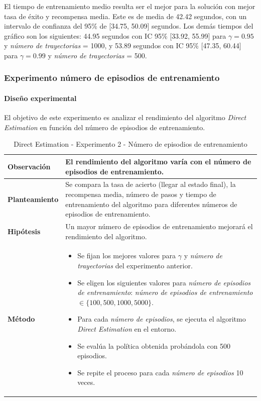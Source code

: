 El tiempo de entrenamiento medio resulta ser el mejor para la solución con mejor tasa de éxito y recompensa media. Este es de media de 42.42 segundos, con un intervalo de confianza del 95\% de [34.75,  50.09] segundos. Los demás tiempos del gráfico son los siguientes: 44.95 segundos con IC 95\% [33.92,  55.99] para $\gamma = 0.95$ y \textit{número de trayectorias} = 1000, y 53.89 segundos con IC 95\% [47.35,  60.44] para $\gamma = 0.99$ y \textit{número de trayectorias} = 500.

\subsubsection{Experimento número de episodios de entrenamiento}

\paragraph{Diseño experimental}

El objetivo de este experimento es analizar el rendimiento del algoritmo \textit{Direct Estimation} en función del número de episodios de entrenamiento.

\begin{table}[H]
    \centering
    \begin{tabularx}{\textwidth}{|p{4cm}|X|} %
        \hline %
        \textbf{Observación} & El rendimiento del algoritmo varía con el número de episodios de entrenamiento.
        \\ \hline
        \textbf{Planteamiento} & Se compara la tasa de acierto (llegar al estado final), la recompensa media, número de pasos y tiempo de entrenamiento del algoritmo para diferentes números de episodios de entrenamiento.
        \\ \hline
        \textbf{Hipótesis} & Un mayor número de episodios de entrenamiento mejorará el rendimiento del algoritmo.
        \\ \hline
        \textbf{Método} & 
        \begin{itemize}
            \item Se fijan los mejores valores para \(\gamma\) y \textit{número de trayectorias} del experimento anterior.
            \item Se eligen los siguientes valores para \textit{número de episodios de entrenamiento}: \textit{número de episodios de entrenamiento} \(\in \{100, 500, 1000, 5000\}\).
            \item Para cada \textit{número de episodios}, se ejecuta el algoritmo \textit{Direct Estimation} en el entorno.
            \item Se evalúa la política obtenida probándola con 500 episodios.
            \item Se repite el proceso para cada \textit{número de episodios} 10 veces.
        \end{itemize}
        \\ \hline
    \end{tabularx}
    \caption{Direct Estimation - Experimento 2 - Número de episodios de entrenamiento}
    \label{tab:diseñoDirectEstimationExp2}
\end{table}

